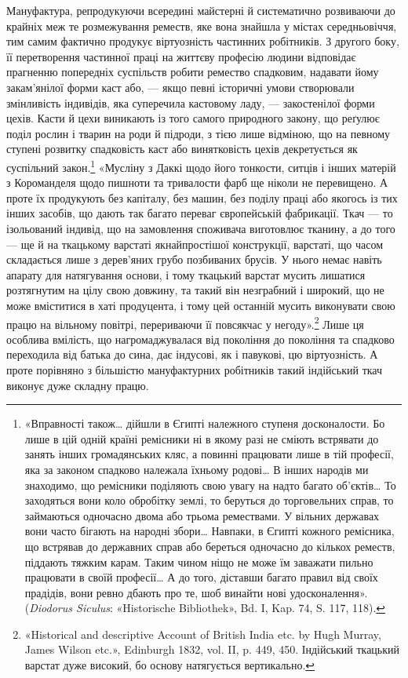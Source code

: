 Мануфактура, репродукуючи всередині майстерні й систематично
розвиваючи до крайніх меж те розмежування реместв,
яке вона знайшла у містах середньовіччя, тим самим фактично
продукує віртуозність частинних робітників. З другого боку, її
перетворення частинної праці на життєву професію людини
відповідає прагненню попередніх суспільств робити ремество спадковим,
надавати йому закам’янілої форми каст або, — якщо
певні історичні умови створювали змінливість індивідів, яка
суперечила кастовому ладу, — закостенілої форми цехів. Касти
й цехи виникають із того самого природного закону, що реґулює
поділ рослин і тварин на роди й підроди, з тією лише відміною,
що на певному ступені розвитку спадковість каст або винятковість
цехів декретується як суспільний закон.\footnote{
«Вправності також\dots{} дійшли в Єгипті належного ступеня досконалости.
Бо лише в цій одній країні ремісники ні в якому разі не сміють
встрявати до занять інших громадянських кляс, а повинні працювати
лише в тій професії, яка за законом спадково належала їхньому родові\dots{}
В інших народів ми знаходимо, що ремісники поділяють свою увагу на
надто багато об'єктів\dots{} То заходяться вони коло обробітку землі, то беруться
до торговельних справ, то займаються одночасно двома або трьома
ремествами. У вільних державах вони часто бігають на народні збори\dots{}
Навпаки, в Єгипті кожного ремісника, що встрявав до державних справ
або береться одночасно до кількох реместв, піддають тяжким карам.
Таким чином ніщо не може їм заважати пильно працювати в своїй професії\dots{}
А до того, діставши багато правил від своїх прадідів, вони ревно
дбають про те, шоб винайти нові удосконалення». (\emph{Diodorus Siculus}:
«Historische Bibliothek», Bd. I, Kap. 74, S. 117, 118).
} «Мусліну з Даккі
щодо його тонкости, ситців і інших матерій з Короманделя щодо
пишноти та тривалости фарб ще ніколи не перевищено. А проте
їх продукують без капіталу, без машин, без поділу праці або
якогось із тих інших засобів, що дають так багато переваг європейській
фабрикації. Ткач — то ізольований індивід, що на замовлення споживача виготовлює
тканину, а до того — ще й на ткацькому
варстаті якнайпростішої конструкції, варстаті, що
часом складається лише з дерев’яних грубо позбиваних брусів.
У нього немає навіть апарату для натягування основи, і тому
ткацький варстат мусить лишатися розтягнутим на цілу свою
довжину, та такий він незграбний і широкий, що не може вміститися в хаті
продуцента, і тому цей останній мусить виконувати свою працю на вільному
повітрі, перериваючи її повсякчас у негоду».\footnote{
«Historical and descriptive Account of British India etc. by
Hugh Murray, James Wilson etc.», Edinburgh 1832, vol. II, p. 449, 450.
Індійський ткацький варстат дуже високий, бо основу натягується вертикально.
}
Лише ця особлива вмілість, що нагромаджувалася
від покоління до покоління та спадково переходила від батька
до сина, дає індусові, як і павукові, цю віртуозність. А проте
порівняно з більшістю мануфактурних робітників такий індійський ткач виконує
дуже складну працю.

